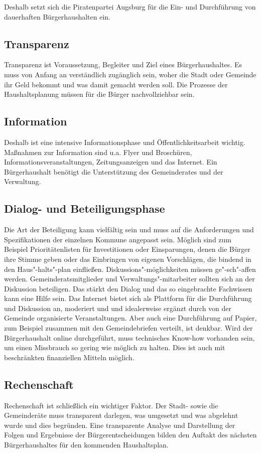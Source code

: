   Deshalb setzt sich die Piratenpartei Augsburg für die Ein- und Durchführung 
  von dauerhaften Bürgerhaushalten ein.
  
  \subsection{Transparenz}
  
  Transparenz ist Voraussetzung, Begleiter und Ziel eines Bürgerhaushaltes. Es 
  muss von Anfang an verständlich zugänglich sein, woher die Stadt oder 
  Gemeinde ihr Geld bekommt und was damit gemacht werden soll. Die Prozesse 
  der Haushaltsplanung müssen für die Bürger nachvollziehbar sein.
  
  \subsection{Information}
  
  Deshalb ist eine intensive Informationsphase und Öffentlichkeitsarbeit 
  wichtig. Maßnahmen zur Information sind u.a. Flyer und Broschüren, 
  Informationsveranstaltungen, Zeitungsanzeigen und das Internet. Ein 
  Bürgerhaushalt benötigt die Unterstützung des Gemeinderates und der 
  Verwaltung.
  
  \subsection{Dialog- und Beteiligungsphase}
  
  Die Art der Beteiligung kann vielfältig sein und muss auf die Anforderungen 
  und Spezifikationen der einzelnen Kommune angepasst sein. Möglich sind zum 
  Beispiel Prioritätenlisten für Investitionen oder Einsparungen, denen die 
  Bürger ihre Stimme geben oder das Einbringen von eigenen Vorschlägen, die 
  bindend in den Haus"-halts"-plan einfließen. Diskussions"-möglichkeiten 
  müssen ge"-sch"-affen werden. Gemeinderatsmitglieder und 
  Verwaltungs"-mitarbeiter sollten sich an der Diskussion beteiligen. Das 
  stärkt den Dialog und das so eingebrachte Fachwissen kann eine Hilfe sein. 
  Das Internet bietet sich als Plattform für die Durchführung und Diskussion 
  an, moderiert und und idealerweise ergänzt durch von der Gemeinde 
  organisierte Veranstaltungen. Aber auch eine Durchführung auf Papier, zum 
  Beispiel zusammen mit den Gemeindebriefen verteilt, ist denkbar. Wird der 
  Bürgerhaushalt online durchgeführt, muss technisches Know-how vorhanden 
  sein, um einen Missbrauch so gering wie möglich zu halten. Dies ist auch mit 
  beschränkten finanziellen Mitteln möglich.
  
  \subsection{Rechenschaft}
  
  Rechenschaft ist schließlich ein wichtiger Faktor. Der Stadt- sowie die 
  Gemeinderäte muss transparent darlegen, was umgesetzt und was abgelehnt 
  wurde und dies begründen. Eine transparente Analyse und Darstellung der 
  Folgen und Ergebnisse der Bürgerentscheidungen bilden den Auftakt des 
  nächsten Bürgerhaushaltes für den kommenden Haushaltsplan.
